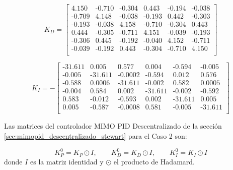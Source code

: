 \begin{equation} \label{eq:KD_mimoPID}
    K_D = \begin{bmatrix}
        4.150 &	\textrm{-}0.710 &	\textrm{-}0.304 &	0.443 &	\textrm{-}0.194 &	\textrm{-}0.038 \\
        \textrm{-}0.709 &	4.148 &	\textrm{-}0.038 &	\textrm{-}0.193 &	0.442 &	\textrm{-}0.303 \\
        \textrm{-}0.193 &	\textrm{-}0.038 &	4.158 &	\textrm{-}0.710 &	\textrm{-}0.304 &	0.443 \\
        0.444 &	\textrm{-}0.305 &	\textrm{-}0.711 &	4.151 &	\textrm{-}0.039 &	\textrm{-}0.193 \\
        \textrm{-}0.306 &	0.445 &	\textrm{-}0.192 &	\textrm{-}0.040 &	4.152 &	\textrm{-}0.711 \\
        \textrm{-}0.039 &	\textrm{-}0.192 &	0.443 &	\textrm{-}0.304 &	\textrm{-}0.710 &	4.150 \\
    \end{bmatrix}
\end{equation}

\begin{equation} \label{eq:KI_mimoPID}
    K_I = -\begin{bmatrix}
    	\textrm{-}31.611 &	0.005 &	0.577 &	0.004 &	\textrm{-}0.594 &	\textrm{-}0.005 \\
    	\textrm{-}0.005 &	\textrm{-}31.611 &	\textrm{-}0.0002 &	\textrm{-}0.594 & 0.012 & 0.576 \\
    	\textrm{-}0.588 &	0.0006 &	\textrm{-}31.611 &	\textrm{-}0.002 &	0.582 &	0.0005 \\
    	\textrm{-}0.004 &	0.584 &	0.002 &	\textrm{-}31.611 &	\textrm{-}0.002 &	\textrm{-}0.592 \\
    	0.583 &	\textrm{-}0.012 &	\textrm{-}0.593 &	0.002 &	\textrm{-}31.611 &	0.005 \\
    	0.005 &	\textrm{-}0.587 &	\textrm{-}0.0008 &	0.581 &	\textrm{-}0.005 &	\textrm{-}31.611 \\
    \end{bmatrix}
\end{equation}

Las matrices del controlador MIMO PID Descentralizado de la sección \ref{sec:mimopid_descentralizado_stewart} para el Caso 2 son:

\begin{equation}
    K_P^0 = K_P \odot I, \qquad K_D^0 = K_D \odot I, \qquad K_I^0 = K_I \odot I
\end{equation}
donde $I$ es la matriz identidad y $\odot$ el producto de Hadamard.

